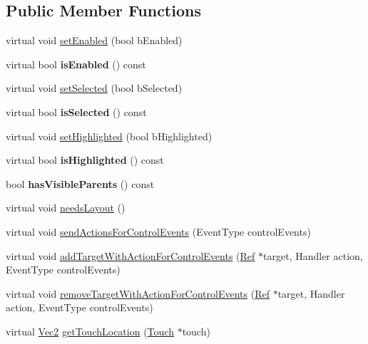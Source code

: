 \subsection*{Public Member Functions}
\begin{DoxyCompactItemize}
\item 
virtual void \hyperlink{classControl_a55339ae920182245d5ec114c33f4b1fd}{set\+Enabled} (bool b\+Enabled)
\item 
\mbox{\label{classControl_afd13dfa538cb1f633addd674122fbabb}} 
virtual bool {\bfseries is\+Enabled} () const
\item 
virtual void \hyperlink{classControl_ab35419d8bb194f540e838a3b796258a7}{set\+Selected} (bool b\+Selected)
\item 
\mbox{\label{classControl_acc4cfd9cbdf08043229968a83c40658d}} 
virtual bool {\bfseries is\+Selected} () const
\item 
virtual void \hyperlink{classControl_a8bde57862133c06d64178fb1a0c31e8b}{set\+Highlighted} (bool b\+Highlighted)
\item 
\mbox{\label{classControl_af9db79603d54c306120f6d14b4311e7a}} 
virtual bool {\bfseries is\+Highlighted} () const
\item 
\mbox{\label{classControl_a9626a1e74663b29a5e7f92d9327d547d}} 
bool {\bfseries has\+Visible\+Parents} () const
\item 
virtual void \hyperlink{classControl_aa3c7bd1c9d2a072c037c6c9232a336a5}{needs\+Layout} ()
\item 
virtual void \hyperlink{classControl_a6a4b1643e8d9ea6f264f1f024760993c}{send\+Actions\+For\+Control\+Events} (Event\+Type control\+Events)
\item 
virtual void \hyperlink{classControl_a114b797f68cc42e3aaabccd0339d7216}{add\+Target\+With\+Action\+For\+Control\+Events} (\hyperlink{classRef}{Ref} $\ast$target, Handler action, Event\+Type control\+Events)
\item 
virtual void \hyperlink{classControl_a1f51f2eaea29c66c58f60fbee9c35e10}{remove\+Target\+With\+Action\+For\+Control\+Events} (\hyperlink{classRef}{Ref} $\ast$target, Handler action, Event\+Type control\+Events)
\item 
virtual \hyperlink{classVec2}{Vec2} \hyperlink{classControl_ab0067c6aeb440e1d42d6ebef4d85cd5c}{get\+Touch\+Location} (\hyperlink{classTouch}{Touch} $\ast$touch)

\end{DoxyCompactItemize}
